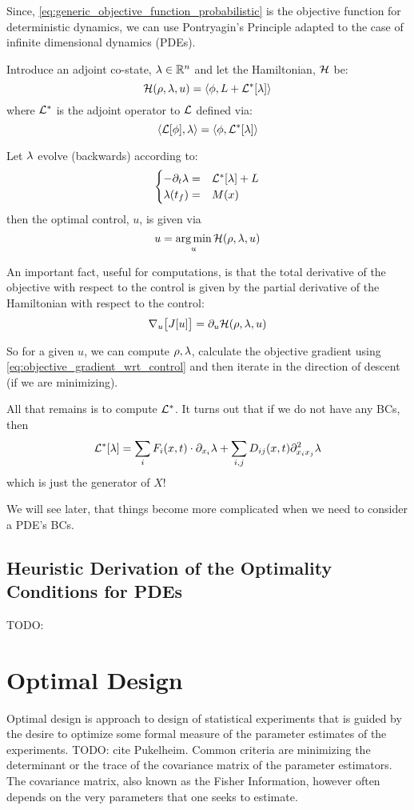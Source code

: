Since, \cref{eq:generic_objective_function_probabilistic} is the objective
function for deterministic dynamics, we can use Pontryagin's Principle adapted
to the case of infinite dimensional dynamics (PDEs). 

Introduce an adjoint co-state, ${\lambda} \in { \mathbb{R} }^n$ and let the Hamiltonian, ${ \mathcal{H} }$ be:
$$
{ \mathcal{H} }({\rho}, {\lambda}, u)= \langle \phi, L + { { \mathcal{L} }^* }[{\lambda}] \rangle$$
where ${ { \mathcal{L} }^* }$ is the adjoint operator to ${ \mathcal{L} }$ defined via:
$$
\langle { \mathcal{L} } [\phi], {\lambda} \rangle =\langle \phi, { { \mathcal{L} }^* }[{\lambda}] \rangle
$$

Let ${\lambda}$ evolve (backwards) according to:
\begin{equation*}
\begin{cases}
-{\partial}_t {\lambda} =& { { \mathcal{L} }^* }[{\lambda}] + L
\\
{\lambda}({ t_f }) =& M(x)  
\end{cases}
\end{equation*}
then the optimal control, $u$, is given via
$$
u = \argmin_u {\H(\f, \l, u)}
$$   

An important fact, useful for computations, is that the total derivative of the
objective with respect to the control is given by the partial derivative of the
Hamiltonian with respect to the control:
\begin{equation}
{ \nabla }_u \big[J[u] \big] = {\partial}_u { \mathcal{H} }({\rho}, {\lambda}, u)
\label{eq:objective_gradient_wrt_control}
\end{equation}

So for a given $u$, we can compute ${\rho},{\lambda}$, calculate the objective gradient
using \cref{eq:objective_gradient_wrt_control} and then iterate in the direction
of descent (if we are minimizing).

All that remains is to compute ${ { \mathcal{L} }^* }$. It turns out that if we do not have any
BCs, then
$$
{ { \mathcal{L} }^* }[{\lambda}] = \sum_i F_i(x,t) \cdot {\partial}_{x_i} {\lambda} + \sum_{i,j} D_{ij}(x,t)
{\partial}^2_{x_i x_j}{\lambda} 
$$ 
which is just the generator of $X$! 

We will see later, that things become more complicated when we need to
consider a PDE's BCs.

 
\subsection{Heuristic Derivation of the Optimality Conditions for PDEs}
\label{sec:Pontryagin_heuristic_derivation}
TODO: \cite{Borzi2012,Lenhart2007}

\section{Optimal Design}
\label{sec:optimal_design}
Optimal design is approach to design of statistical experiments that is guided
by the 
desire to optimize some formal measure of the parameter estimates of the
experiments. TODO: cite Pukelheim. Common criteria are minimizing the
determinant or the trace of the covariance matrix of the parameter estimators. 
The covariance matrix, also known as the Fisher Information, however often
depends on the very parameters that one seeks to estimate. 

